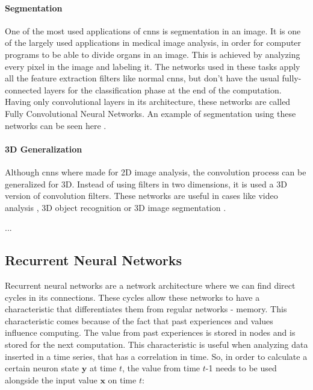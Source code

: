 \documentclass[
  twoside,
  11pt, a4paper,
  footinclude=true,
  headinclude=true,
  cleardoublepage=empty
]{scrbook}
\begin{document}
        \paragraph{Segmentation}
          One of the most used applications of \glspl{cnn} is segmentation in an image. It is one of the largely used applications in medical image analysis, in order for computer programs to be able to divide organs in an image. This is achieved by analyzing every pixel in the image and labeling it. The networks used in these tasks apply all the feature extraction filters like normal \glspl{cnn}, but don't have the usual fully-connected layers for the classification phase at the end of the computation. Having only convolutional layers in its architecture, these networks are called Fully Convolutional Neural Networks. An example of segmentation using these networks can be seen here \cite{long2015fully}.

        \paragraph{3D Generalization}
          Although \glspl{cnn} where made for 2D image analysis, the convolution process can be generalized for 3D. Instead of using filters in two dimensions, it is used a 3D version of convolution filters.
          These networks are useful in cases like video analysis \cite{ji20133d,diba2016efficient}, 3D object recognition \cite{maturana2015voxnet,socher2012convolutional,huang2016point} or 3D image segmentation \cite{kamnitsas2017efficient}.

          ...

      \subsection{Recurrent Neural Networks}
        Recurrent neural networks are a network architecture where we can find direct cycles in its connections. These cycles allow these networks to have a characteristic that differentiates them from regular networks - memory. This characteristic comes because of the fact that past experiences and values influence computing. The value from past experiences is stored in nodes and is stored for the next computation. This characteristic is useful when analyzing data inserted in a time series, that has a correlation in time. So, in order to calculate a certain neuron state $\boldsymbol{y}$ at time $t$, the value from time $t$-1 needs to be used alongside the input value $\boldsymbol{x}$ on time $t$:
\end{document}
